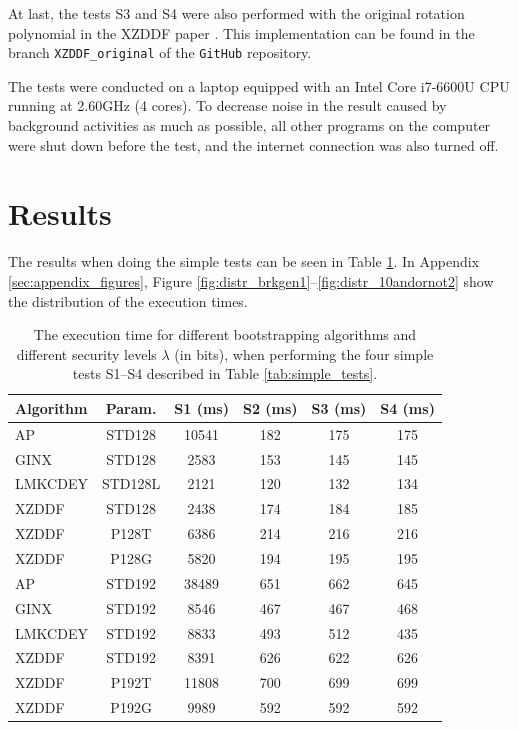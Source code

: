 At last, the tests S3 and S4 were also performed with the original rotation polynomial in the XZDDF paper \cite{cite:fast_bootstrap_crypto23}. This implementation can be found in the branch \texttt{XZDDF\_original} of the \texttt{GitHub} repository.

The tests were conducted on a laptop equipped with an Intel Core i7-6600U CPU running at 2.60GHz (4 cores). To decrease noise in the result caused by background activities as much as possible, all other programs on the computer were shut down before the test, and the internet connection was also turned off.

\section{Results}

The results when doing the simple tests can be seen in Table \ref{tab:efficiency_res}. In Appendix \ref{sec:appendix_figures}, Figure \ref{fig:distr_brkgen1}--\ref{fig:distr_10andornot2} show the distribution of the execution times. 

\begin{table}[ht]
\centering
\caption{The execution time for different bootstrapping algorithms and different security levels $\lambda$ (in bits), when performing the four simple tests S1--S4 described in Table \ref{tab:simple_tests}.}
\begin{tabular}{lc|cccc}
\toprule
\textbf{Algorithm} & \textbf{Param.} & \textbf{S1} (ms)  & \textbf{S2} (ms) & \textbf{S3} (ms) & \textbf{S4} (ms) \\
\midrule
AP & STD128 & 10541 & 182 & 175 & 175 \\
GINX & STD128 & 2583 & 153 & 145 & 145 \\
LMKCDEY & STD128L & 2121 & 120 & 132 & 134 \\
XZDDF & STD128 & 2438 & 174 & 184 & 185 \\
XZDDF & P128T & 6386 & 214 & 216 & 216 \\
XZDDF & P128G & 5820 & 194 & 195 & 195 \\
AP & STD192 & 38489 & 651 & 662 & 645 \\
GINX & STD192 & 8546 & 467 & 467 & 468 \\
LMKCDEY & STD192 & 8833 & 493 & 512 & 435 \\
XZDDF & STD192 & 8391 & 626 & 622 & 626 \\
XZDDF & P192T & 11808 & 700 & 699 & 699 \\
XZDDF & P192G & 9989 & 592 & 592 & 592 \\
\bottomrule
\end{tabular}
\label{tab:efficiency_res}
\end{table}

